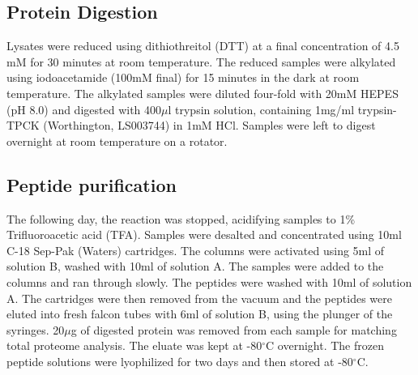 \subsection{Protein Digestion}
Lysates were reduced using dithiothreitol (DTT) at a final concentration of 4.5 mM for 30 minutes at room temperature. The reduced samples were alkylated using iodoacetamide (100mM final) for 15 minutes in the dark at room temperature. The alkylated samples were diluted four-fold with 20mM HEPES (pH 8.0) and digested with 400$\mu$l trypsin solution, containing 1mg/ml trypsin-TPCK (Worthington, LS003744) in 1mM HCl. Samples were left to digest overnight at room temperature on a rotator.

\subsection{Peptide purification}
The following day, the reaction was stopped, acidifying samples to 1\% Trifluoroacetic acid (TFA). Samples were desalted and concentrated using 10ml C-18 Sep-Pak (Waters) cartridges. The columns were activated using 5ml of solution B, washed with 10ml of solution A. The samples were added to the columns and ran through slowly. The peptides were washed with 10ml of solution A. The cartridges were then removed from the vacuum and the peptides were eluted into fresh falcon tubes with 6ml of solution B, using the plunger of the syringes. 20$\mu$g of digested protein was removed from each sample for matching total proteome analysis. The eluate was kept at -80$^{\circ}$C overnight. The frozen peptide solutions were lyophilized for two days and then stored at -80$^{\circ}$C.
%

